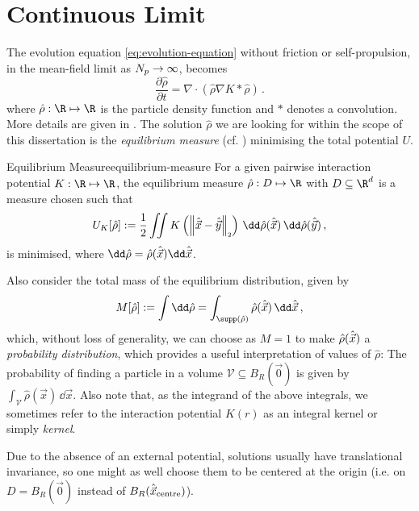 \section{Continuous Limit}
The evolution equation \eqref{eq:evolution-equation} without friction or self-propulsion, in the mean-field limit as $N_p \rightarrow \infty$, becomes
\begin{equation}
  \frac{\partial \hat{\rho}}{\partial t} = \nabla \cdot \left(\hat{\rho} \nabla K * \hat{\rho}\right)\,.
  \label{eq:continuous-evolution-equation}
\end{equation}
where $\hat{\rho}: \R \mapsto \R$ is the particle density function and $*$ denotes a convolution.
More details are given in \cite{2014-carrillo-derivation-of-mean-field, 2021-carrillo-radial}.
The solution $\hat{\rho}$ we are looking for within the scope of this dissertation is the \textit{equilibrium measure} (cf. ) minimising the total potential $U$.

\begin{definition}{Equilibrium Measure}{equilibrium-measure}
  For a given pairwise interaction potential $K: \R \mapsto \R$, the equilibrium measure $\hat{\rho}: D \mapsto \R$ with $D \subseteq \R^d$ is a measure chosen such that
  $$U_K[\hat{\rho}] := \frac{1}{2} \iint K\left(\norm{\hatvec{x} - \hatvec{y}}\right) \,\dd\hat{\rho}(\hatvec{x})\,\dd\hat{\rho}(\hatvec{y})\,,$$
  is minimised, where $\dd\hat{\rho} = \hat{\rho}(\hatvec{x})\dd\hatvec{x}$.
\end{definition}
Also consider the total mass of the equilibrium distribution, given by
\begin{equation}
  M[\hat{\rho}] := \int \dd\hat{\rho} = \int_{\supp(\hat{\rho})} \hat{\rho}(\hatvec{x}) \,\dd\hatvec{x}\,,
  \label{eq:measure-mass}
\end{equation}
which, without loss of generality, we can choose as $M = 1$ to make $\hat{\rho}(\hat{\vec{x}})$ a \textit{probability distribution}, which provides a useful interpretation of values of $\hat{\rho}$:
The probability of finding a particle in a volume $\mathcal{V} \subseteq B_R(\vec{0})$ is given by $\int_{\mathcal{V}} \hat{\rho}(\vec{x}) \,\dd\vec{x}$.
Also note that, as the integrand of the above integrals, we sometimes refer to the interaction potential $K(r)$ as an integral kernel or simply \textit{kernel}.

Due to the absence of an external potential, solutions usually have translational invariance, so one might as well choose them to be centered at the origin (i.e. on $D = B_R(\vec{0})$ instead of $B_R(\hat{\vec{x}}_{\text{centre}})$).

